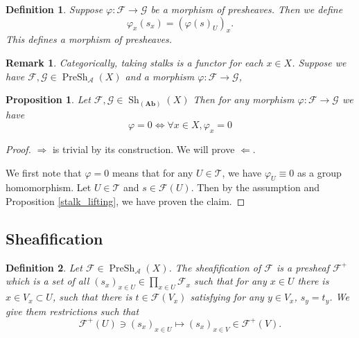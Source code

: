 \documentclass{article}
\newtheorem{proposition}{Proposition}[section]
\newtheorem{definition}{Definition}[section]
\newtheorem{remark}{Remark}[section]
\numberwithin{equation}{section}
\DeclareMathOperator{\PreSh}{PreSh}
\DeclareMathOperator{\Sh}{Sh}
\begin{document}
\begin{definition}
\label{stalk_morphism}
Suppose $\varphi:\mathcal{F}\to\mathcal{G}$ be a morphism of presheaves. Then we define 
\begin{equation*}
\varphi_x(s_x)=(\varphi(s)_U)_x.
\end{equation*}
This defines a morphism of presheaves. 
\end{definition}

\begin{remark}
Categorically, taking stalks is a functor for each $x\in X$. Suppose we have $\mathcal{F},\mathcal{G}\in\PreSh_\mathcal{A}(X)$ and a morphism $\varphi:\mathcal{F}\to\mathcal{G}$, 
\end{remark}

\begin{proposition}
Let $\mathcal{F},\mathcal{G}\in\Sh_{(\mathbf{Ab})}(X)$ Then for any morphism $\varphi:\mathcal{F}\to\mathcal{G}$ we have
\begin{equation*}
\varphi = 0 \Leftrightarrow \forall x\in X,  \varphi_x = 0
\end{equation*}
\label{unit_sheaf_morphism}
\end{proposition}

\begin{proof}
$\Rightarrow$ is trivial by its construction. We will prove $\Leftarrow$.\\
\par We first note that $\varphi=0$ means that for any $U\in \mathcal{T}$, we have $\varphi_U\equiv0$ as a group homomorphism. Let $U\in\mathcal{T}$ and $s\in\mathcal{F}(U)$. Then by the assumption and Proposition \ref{stalk_lifting}, we have proven the claim.
\end{proof}

\subsection{Sheafification}

\begin{definition}
Let $\mathcal{F}\in\PreSh_\mathcal{A}(X)$. The sheafification of $\mathcal{F}$ is a presheaf $\mathcal{F}^+$ which is a set of all $(s_x)_{x\in U}\in\prod_{x\in U}\mathcal{F}_x$ such that
for any $x\in U$ there is $x\in V_x\subset U$, such that there is $t\in\mathcal{F}(V_x)$ satisfying for any $y\in V_x$, $s_y = t_y$. We give them restrictions such that
\begin{equation*}
\mathcal{F}^+(U)\ni (s_x)_{x\in U}\mapsto (s_x)_{x\in V}\in \mathcal{F}^+(V).
\end{equation*}
\end{definition}
\end{document}
